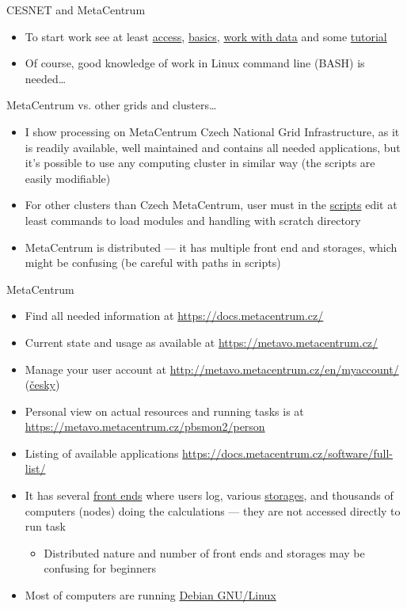 \documentclass[compress, ucs, xelatex, 11pt, xcolor=x11names, aspectratio=169,
	hyperref={
		bookmarks=true,
		unicode=true,
		colorlinks=true,
		pdftitle={HybSeq course},
		plainpages=false,
		pdfauthor={Vojtech Zeisek},
		pdfsubject={Practical processing of HybSeq target enrichment sequencing data on computing grids like MetaCentrum},
		pdfcreator={XeLaTeX},
		pdfkeywords={BASH, command line, GNU, HybSeq, Linux, MetaCentrum, sequencing shell, target enrichment},
		linkcolor=Turquoise4, %
		anchorcolor=DodgerBlue4, %
		citecolor=DodgerBlue4, %
		filecolor=DodgerBlue4, %
		menucolor=Tan4, %
		urlcolor=DarkOliveGreen4, %
		pdftex},
	url={hyphens, lowtilde} %
	]{beamer}
\begin{document}
\begin{frame}[allowframebreaks]{CESNET and MetaCentrum}
\begin{itemize}
		\item To start work see at least \href{https://docs.metacentrum.cz/access/log-in/}{access}, \href{https://docs.metacentrum.cz/basics/concepts/}{basics}, \href{https://docs.metacentrum.cz/data/data-within/}{work with data} and some \href{https://docs.metacentrum.cz/tutorials/}{tutorial}
		\item Of course, good knowledge of work in Linux command line (BASH) is needed\ldots
	\end{itemize}
	\vfill
	\begin{alertblock}{MetaCentrum vs. other grids and clusters\ldots}
	\begin{itemize}
		\item I show processing on MetaCentrum Czech National Grid Infrastructure, as it is readily available, well maintained and contains all needed applications, but it's possible to use any computing cluster in similar way (the scripts are easily modifiable)
		\item For other clusters than Czech MetaCentrum, user must in the \href{https://github.com/V-Z/hybseq-scripts}{scripts} edit at least commands to load modules and handling with scratch directory
		\item MetaCentrum is distributed --- it has multiple front end and storages, which might be confusing (be careful with paths in scripts)
	\end{itemize}
	\end{alertblock}
	\vfill
\end{frame}

\begin{frame}{MetaCentrum}
	\begin{itemize}
		\item Find all needed information at \url{https://docs.metacentrum.cz/}
		\item Current state and usage as available at \url{https://metavo.metacentrum.cz/}
		\item Manage your user account at \url{http://metavo.metacentrum.cz/en/myaccount/} (\href{https://metavo.metacentrum.cz/cs/myaccount/}{česky})
		\item Personal view on actual resources and running tasks is at \url{https://metavo.metacentrum.cz/pbsmon2/person}
		\item Listing of available applications \url{https://docs.metacentrum.cz/software/full-list/}
		\item It has several \href{https://docs.metacentrum.cz/access/log-in/}{front ends} where users log, various \href{https://docs.metacentrum.cz/data/data-within/}{storages}, and thousands of computers (nodes) doing the calculations --- they are not accessed directly to run task
		\begin{itemize}
			\item Distributed nature and number of front ends and storages may be confusing for beginners
		\end{itemize}
		\item Most of computers are running \href{https://www.debian.org/}{Debian GNU/Linux}
	\end{itemize}
\end{frame}
\end{document}
